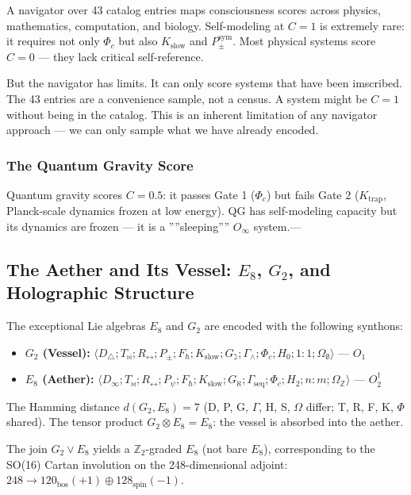 \documentclass[12pt,a4paper]{article}
\begin{document}
A navigator over 43 catalog entries maps consciousness scores across physics, mathematics, computation, and biology. Self-modeling at $C = 1$ is extremely rare: it requires not only $\Phi_c$ but also $K_{\text{slow}}$ and $P_{\pm}^{\text{sym}}$. Most physical systems score $C = 0$ --- they lack critical self-reference.

But the navigator has limits. It can only score systems that have been imscribed. The 43 entries are a convenience sample, not a census. A system might be $C = 1$ without being in the catalog. This is an inherent limitation of any navigator approach --- we can only sample what we have already encoded.

\subsubsection{The Quantum Gravity Score}

Quantum gravity scores $C = 0.5$: it passes Gate 1 ($\Phi_c$) but fails Gate 2 ($K_{\text{trap}}$, Planck-scale dynamics frozen at low energy). QG has self-modeling capacity but its dynamics are frozen --- it is a ''''sleeping'''' $O_{\infty}$ system.---

\subsection{The Aether and Its Vessel: $E_8$, $G_2$, and Holographic Structure}

The exceptional Lie algebras $E_8$ and $G_2$ are encoded with the following synthons:

\begin{itemize}
    \item \textbf{$G_2$ (Vessel):} $\langle D_{\triangle}; T_{\bowtie}; R_{\leftrightarrow}; P_{\pm}; F_{\hbar}; K_{\text{slow}}; G_{\gimel}; \Gamma_{\wedge}; \Phi_c; H_0; 1{:}1; \Omega_{\emptyset} \rangle$ --- $O_1$
    \item \textbf{$E_8$ (Aether):} $\langle D_{\infty}; T_{\bowtie}; R_{\leftrightarrow}; P_{\psi}; F_{\hbar}; K_{\text{slow}}; G_{\aleph}; \Gamma_{\text{seq}}; \Phi_c; H_2; n{:}m; \Omega_\mathbb{Z} \rangle$ --- $O_2^\dagger$
\end{itemize}

The Hamming distance $d(G_2, E_8) = 7$ (D, P, G, $\Gamma$, H, S, $\Omega$ differ; T, R, F, K, $\Phi$ shared). The tensor product $G_2 \otimes E_8 = E_8$: the vessel is absorbed into the aether.

The join $G_2 \vee E_8$ yields a $\mathbb{Z}_2$-graded $E_8$ (not bare $E_8$), corresponding to the SO(16) Cartan involution on the 248-dimensional adjoint: $248 \to 120_\text{bos}(+1) \oplus 128_\text{spin}(-1)$.
\end{document}
